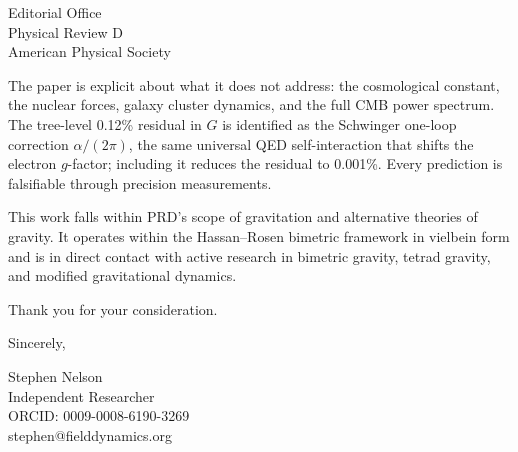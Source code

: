 \documentclass[11pt]{letter}
\begin{document}
\begin{letter}{Editorial Office\\Physical Review D\\American Physical Society}

The paper is explicit about what it does not address: the cosmological constant, the nuclear forces, galaxy cluster dynamics, and the full CMB power spectrum. The tree-level 0.12\% residual in $G$ is identified as the Schwinger one-loop correction $\alpha/(2\pi)$, the same universal QED self-interaction that shifts the electron $g$-factor; including it reduces the residual to 0.001\%. Every prediction is falsifiable through precision measurements.


This work falls within PRD's scope of gravitation and alternative theories of gravity. It operates within the Hassan--Rosen bimetric framework in vielbein form and is in direct contact with active research in bimetric gravity, tetrad gravity, and modified gravitational dynamics.

Thank you for your consideration.

\closing{Sincerely,}

Stephen Nelson\\
Independent Researcher\\
ORCID: 0009-0008-6190-3269\\
stephen@fielddynamics.org

\end{letter}
\end{document}
